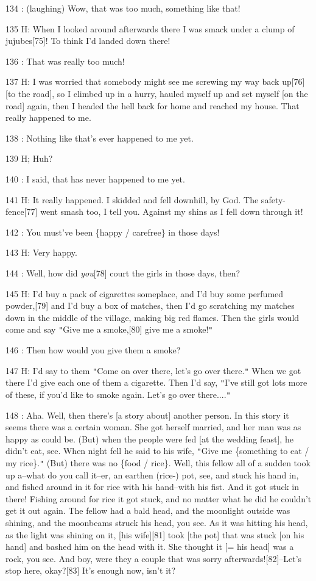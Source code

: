134  : (laughing) Wow, that was too much, something like that!

135 H: When I looked around afterwards there I was smack under a clump of jujubes[75]!
To think I'd landed down there!

136  : That was really too much!

137 H: I was worried that somebody might see me screwing my way back up[76] [to
the road], so I climbed up in a hurry, hauled myself up and set myself [on the
road] again, then I headed the hell back for home and reached my house. That really
happened to me.

138  : Nothing like that's ever happened to me yet.

139 H; Huh?

140  : I said, that has never happened to me yet.

141 H: It really happened. I skidded and fell downhill, by God. The safety-fence[77]
went smash too, I tell you. Against my shins as I fell down through it!

142  : You must've been \{happy / carefree\} in those days!

143 H: Very happy.

144  : Well, how did \textit{you}[78] court the girls in those days, then?

145 H: I'd buy a pack of cigarettes someplace, and I'd buy some perfumed powder,[79]
and I'd buy a box of matches, then I'd go scratching my matches down in the middle
of the village, making big red flames. Then the girls would come and say \texttt{"}Give
me a smoke,[80] give me a smoke!\texttt{"}

146  : Then how would you give them a smoke?

147 H: I'd say to them \texttt{"}Come on over there, let's go over there.\texttt{"}
When we got there I'd give each one of them a cigarette. Then I'd say, \texttt{"}I've
still got lots more of these, if you'd like to smoke again. Let's go over there....\texttt{"}

148  : Aha. Well, then there's [a story about] another person. In this story it
seems there was a certain woman. She got herself married, and her man was as happy
as could be. (But) when the people were fed [at the wedding feast], he didn't eat,
see. When night fell he said to his wife, \texttt{"}Give me \{something to eat
/ my rice\}.\texttt{"} (But) there was no \{food / rice\}. Well, this fellow all
of a sudden took up a--what do you call it--er, an earthen (rice-) pot, see, and
stuck his hand in, and fished around in it for rice with his hand--with his fist.
And it got stuck in there! Fishing around for rice it got stuck, and no matter
what he did he couldn't get it out again. The fellow had a bald head, and the moonlight
outside was shining, and the moonbeams struck his head, you see. As it was hitting
his head, as the light was shining on it, [his wife][81] took [the pot] that was
stuck [on his hand] and bashed him on the head with it. She thought it [= his head]
was a rock, you see. And boy, were they a couple that was sorry afterwards![82]--Let's
stop here, okay?[83] It's enough now, isn't it?

